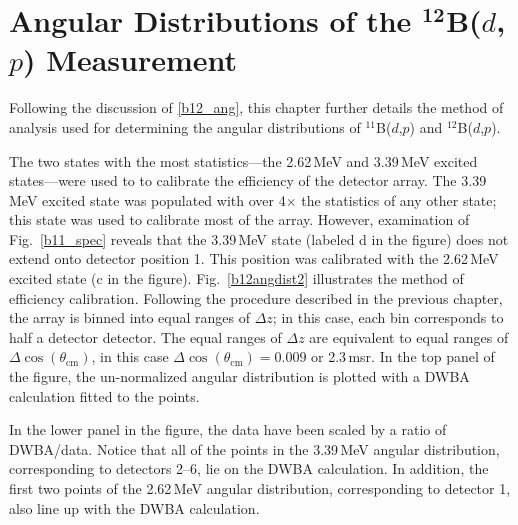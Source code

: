 \chapter[\texorpdfstring{Angular Distributions of the $^\text{12}$B\lowercase{($d$,$p$)} Measurement}{Angular Distributions of the 12B(d,p) Measurement}]{\texorpdfstring{Angular Distributions of the \newline $^\mathbf{12}$B($d$,$p$) Measurement}{Angular Distributions of the 12B(d,p) Measurement}}
\label{badang}
Following the discussion of \ref{b12_ang}, this chapter further details the method of analysis used for determining the angular distributions of $^{11}$B($d$,$p$) and $^{12}$B($d$,$p$).

The two states with the most statistics---the 2.62\,MeV and 3.39\,MeV excited states---were used to to calibrate the efficiency of the detector array.  The 3.39\,MeV excited state was populated with over 4$\times$ the statistics of any other state; this state was used to calibrate most of the array.  However, examination of Fig.~\ref{b11_spec} reveals that the 3.39\,MeV state (labeled d in the figure) does not extend onto detector position 1.  This position was calibrated with the 2.62\,MeV excited state (c in the figure).  Fig.~\ref{b12angdist2} illustrates the method of efficiency calibration. Following the procedure described in the previous chapter, the array is binned into equal ranges of $\Delta z$; in this case, each bin corresponds to half a detector detector.  The equal ranges of $\Delta z$ are equivalent to equal ranges of $\Delta \cos(\theta_\mathrm{cm})$, in this case $\Delta \cos(\theta_\mathrm{cm})=0.009$ or 2.3\,msr.  In the top panel of the figure, the un-normalized angular distribution is plotted with a DWBA calculation fitted to the points. 

In the lower panel in the figure, the data have been scaled by a ratio of DWBA/data.  Notice that all of the points in the 3.39\,MeV angular distribution, corresponding to detectors 2--6, lie on the DWBA calculation.  In addition, the first two points of the 2.62\,MeV angular distribution, corresponding to detector 1, also line up with the DWBA calculation. 

